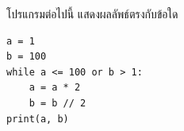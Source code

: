 \question โปรแกรมต่อไปนี้ แสดงผลลัพธ์ตรงกับข้อใด
\begin{verbatim}
a = 1
b = 100
while a <= 100 or b > 1:
    a = a * 2
    b = b // 2
print(a, b)
\end{verbatim}

